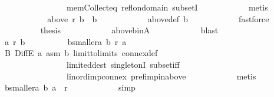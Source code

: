 \begin{isabellebody}
\ \ \ \ \ \ \ \ \ \ \ \ \ \ \ \ mem{\isacharunderscore}{\kern0pt}Collect{\isacharunderscore}{\kern0pt}eq\ refl{\isacharunderscore}{\kern0pt}on{\isacharunderscore}{\kern0pt}domain\ subsetI\isanewline
\ \ \ \ \ \ \ \ \ \ \isamarkupfalse%
\ metis\isanewline
\ \ \ \ \ \ \ \ \isamarkupfalse%
\ \isamarkupfalse%
\ {\isachardoublequoteopen}above\ r\ b\ {\isacharequal}{\kern0pt}\ {\isacharbraceleft}{\kern0pt}b{\isacharbraceright}{\kern0pt}{\isachardoublequoteclose}\isanewline
\ \ \ \ \ \ \ \ \ \ \isamarkupfalse%
\ above{\isacharunderscore}{\kern0pt}def\ b\isanewline
\ \ \ \ \ \ \ \ \ \ \isamarkupfalse%
\ fastforce\isanewline
\ \ \ \ \ \ \ \ \isamarkupfalse%
\ {\isacharquery}{\kern0pt}thesis\isanewline
\ \ \ \ \ \ \ \ \ \ \isamarkupfalse%
\ above{\isacharunderscore}{\kern0pt}b{\isacharunderscore}{\kern0pt}in{\isacharunderscore}{\kern0pt}A\isanewline
\ \ \ \ \ \ \ \ \ \ \isamarkupfalse%
\ blast\isanewline
\ \ \ \ \ \ \isamarkupfalse%
\isanewline
\ \ \ \ \ \ \ \ \isamarkupfalse%
\ {\isachardoublequoteopen}{\isasymnot}a\ {\isasympreceq}\isactrlsub r\ b{\isachardoublequoteclose}\isanewline
\ \ \ \ \ \ \ \ \isamarkupfalse%
\ b{\isacharunderscore}{\kern0pt}smaller{\isacharunderscore}{\kern0pt}a{\isacharcolon}{\kern0pt}\ {\isachardoublequoteopen}b\ {\isasympreceq}\isactrlsub r\ a{\isachardoublequoteclose}\isanewline
\ \ \ \ \ \ \ \ \ \ \isamarkupfalse%
\ B\ DiffE\ a\ asm\ b\ limit{\isacharunderscore}{\kern0pt}to{\isacharunderscore}{\kern0pt}limits\ connex{\isacharunderscore}{\kern0pt}def\isanewline
\ \ \ \ \ \ \ \ \ \ \ \ \ \ \ \ limited{\isacharunderscore}{\kern0pt}dest\ singletonI\ subset{\isacharunderscore}{\kern0pt}iff\isanewline
\ \ \ \ \ \ \ \ \ \ \ \ \ \ \ \ lin{\isacharunderscore}{\kern0pt}ord{\isacharunderscore}{\kern0pt}imp{\isacharunderscore}{\kern0pt}connex\ pref{\isacharunderscore}{\kern0pt}imp{\isacharunderscore}{\kern0pt}in{\isacharunderscore}{\kern0pt}above\isanewline
\ \ \ \ \ \ \ \ \ \ \isamarkupfalse%
\ metis\isanewline
\ \ \ \ \ \ \ \ \isamarkupfalse%
\ b{\isacharunderscore}{\kern0pt}smaller{\isacharunderscore}{\kern0pt}a{\isacharunderscore}{\kern0pt}{}{\isacharcolon}{\kern0pt}\ {\isachardoublequoteopen}{\isacharparenleft}{\kern0pt}b{\isacharcomma}{\kern0pt}\ a{\isacharparenright}{\kern0pt}\ {\isasymin}\ r{\isachardoublequoteclose}\isanewline
\ \ \ \ \ \ \ \ \ \ \isamarkupfalse%
\ simp\isanewline

\end{isabellebody}
